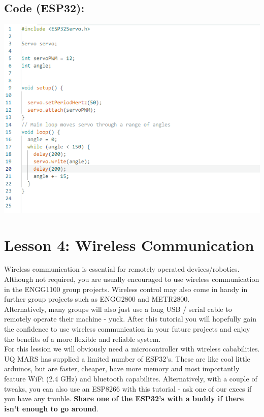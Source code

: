 \documentclass[a4paper,12pt]{report}
\newcommand{\diagramWidth}{150mm}
\begin{document}
    \subsection*{Code (ESP32):}
        \begin{mdframed}[linewidth = 3, linecolor = turbo_purple]
            \includegraphics[width = \diagramWidth]{Assets/servoCode.png}
        \end{mdframed}
    \newpage

\newpage

\section*{Lesson 4: Wireless Communication}

    Wireless communication is essential for remotely operated devices/robotics.
    Although not required, you are usually encouraged to use wireless 
    communication in the ENGG1100 group projects. Wireless control may also come in handy in further
    group projects such as ENGG2800 and METR2800. \\

    Alternatively, many groups will also just use a long USB / serial cable to remotely operate their 
    machine - yuck. After this tutorial you will hopefully gain the confidence to use 
    wireless communication in your future projects and enjoy the benefits of a more flexible and reliable system. \\

    For this lession we will obviously need a microcontroller with wireless cababilities. UQ MARS has supplied a limited number
    of ESP32's. These are like cool little arduinos, but are faster, cheaper, have more memory and most importantly feature
    WiFi (2.4 GHz) and bluetooth capabilites. Alternatively, with a couple of tweaks, you can also use an ESP8266 with this tutorial 
    - ask one of our execs if you have any trouble. 
    \textbf{Share one of the ESP32's with a buddy if there isn't enough to go around}.\\
\end{document}
